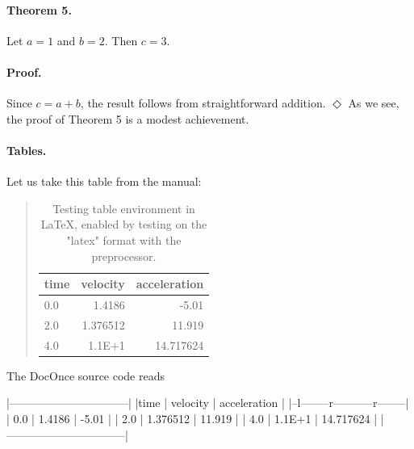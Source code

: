 \documentclass[%
oneside,                 %
final,                   %
10pt]{article}
\theoremstyle{definition}
\begin{document}
\begin{enumerate}
\paragraph{Theorem 5.}
Let $a=1$ and $b=2$. Then $c=3$.
\paragraph{Proof.}
Since $c=a+b$, the result follows from straightforward addition.
$\Diamond$
As we see, the proof of Theorem 5 is a modest
achievement.
\paragraph{Tables.}
\label{subsec:table}
Let us take this table from the manual:
\begin{table}
\caption{
Testing table environment in {\LaTeX}, enabled by testing on the "latex" format
with the preprocessor.
\label{mytab}
}
\begin{quote}
\begin{tabular}{lrr}
\hline
\multicolumn{1}{c}{ time } & \multicolumn{1}{c}{ velocity } & \multicolumn{1}{c}{ acceleration } \\
\hline
0.0  & 1.4186   & -5.01        \\
2.0  & 1.376512 & 11.919       \\
4.0  & 1.1E+1   & 14.717624    \\
\hline
\end{tabular}
\end{quote}
\noindent
\end{table}
The DocOnce source code reads
\bccq

  |--------------------------------|
  |time  | velocity | acceleration |
  |--l--------r-----------r--------|
  | 0.0  | 1.4186   | -5.01        |
  | 2.0  | 1.376512 | 11.919       |
  | 4.0  | 1.1E+1   | 14.717624    |
  |--------------------------------|


\eccq


\end{enumerate}
\end{document}

